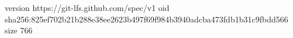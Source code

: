 version https://git-lfs.github.com/spec/v1
oid sha256:825ef702b21b288e38ee2623b497f69f984b3940adcba473fdb1b31c9fbdd566
size 766
